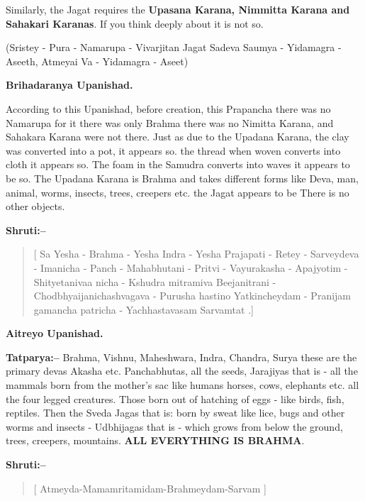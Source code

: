Similarly, the Jagat requires the \textbf{Upasana Karana, Nimmitta Karana and Sahakari Karanas}. If you think deeply about it is not so.

(Sristey - Pura - Namarupa - Vivarjitan Jagat  Sadeva Saumya - Yidamagra - Aseeth, Atmeyai Va - Yidamagra - Aseet)

\begin{flushright}
\textbf{Brihadaranya Upanishad.}
\end{flushright}

According to this Upanishad, before creation, this Prapancha there was no Namarupa for it there was only Brahma there was no Nimitta Karana, and Sahakara Karana were not there. Just as due to the Upadana Karana, the clay was converted into a pot, it appears so. the thread when woven converts into cloth it appears so. The foam in the Samudra converts into waves it appears to be so. The Upadana Karana is Brahma and takes different forms like Deva, man, animal, worms, insects, trees, creepers etc. the Jagat appears to be There is no other objects.

\textbf{Shruti:–}

\begin{verse}
[ Sa Yesha - Brahma - Yesha Indra - Yesha Prajapati - Retey - Sarveydeva - Imanicha - Panch - Mahabhutani - Pritvi - Vayurakasha - Apajyotim - Shityetanivaa nicha - Kshudra mitramiva Beejanitrani - Chodbhyaijanicha\break shvagava - Purusha hastino Yatkincheydam - Pranijam gamancha patricha - Yachhastavasam Sarvam\break tat .]
\end{verse}

\begin{flushright}
\textbf{Aitreyo Upanishad.}
\end{flushright}

\textbf{Tatparya:–} Brahma, Vishnu, Maheshwara, Indra, Chandra, Surya these are the primary devas Akasha etc. Panchabhutas, all the seeds, Jarajiyas that is - all the mammals born from the mother's sac like humans horses, cows, elephants etc. all the four legged creatures. Those born out of hatching of eggs - like birds, fish, reptiles. Then the Sveda Jagas that is: born by sweat like lice, bugs and other worms and insects - Udbhijagas that is - which grows from below the ground, trees, creepers, mountains. \textbf{ALL EVERYTHING IS BRAHMA}.

\newpage

\textbf{Shruti:–}

\begin{verse}
[ Atmeyda-Mamamritamidam-Brahmeydam-Sarvam ]
\end{verse}

